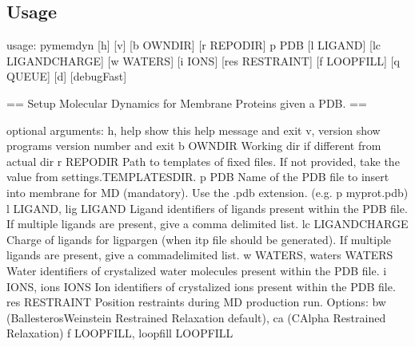 \documentclass[letterpaper,10pt,english]{sphinxmanual}
\begin{document}
\subsection{Usage}
\label{\detokenize{pymemdyn:usage}}
\begin{sphinxVerbatim}[commandchars=\\\{\}]
usage: pymemdyn [\PYGZhy{}h] [\PYGZhy{}v] [\PYGZhy{}b OWN\PYGZus{}DIR] [\PYGZhy{}r REPO\PYGZus{}DIR] \PYGZhy{}p PDB [\PYGZhy{}l LIGAND]
             [\PYGZhy{}\PYGZhy{}lc LIGAND\PYGZus{}CHARGE] [\PYGZhy{}w WATERS] [\PYGZhy{}i IONS] [\PYGZhy{}\PYGZhy{}res RESTRAINT]
             [\PYGZhy{}f LOOP\PYGZus{}FILL] [\PYGZhy{}q QUEUE] [\PYGZhy{}d] [\PYGZhy{}\PYGZhy{}debugFast]

== Setup Molecular Dynamics for Membrane Proteins given a PDB. ==

optional arguments:
  \PYGZhy{}h, \PYGZhy{}\PYGZhy{}help            show this help message and exit
  \PYGZhy{}v, \PYGZhy{}\PYGZhy{}version         show program\PYGZsq{}s version number and exit
  \PYGZhy{}b OWN\PYGZus{}DIR            Working dir if different from actual dir
  \PYGZhy{}r REPO\PYGZus{}DIR           Path to templates of fixed files. If not provided,
                        take the value from settings.TEMPLATES\PYGZus{}DIR.
  \PYGZhy{}p PDB                Name of the PDB file to insert into membrane for MD
                        (mandatory). Use the .pdb extension. (e.g. \PYGZhy{}p
                        myprot.pdb)
  \PYGZhy{}l LIGAND, \PYGZhy{}\PYGZhy{}lig LIGAND
                        Ligand identifiers of ligands present within the PDB
                        file. If multiple ligands are present, give a comma\PYGZhy{}
                        delimited list.
  \PYGZhy{}\PYGZhy{}lc LIGAND\PYGZus{}CHARGE    Charge of ligands for ligpargen (when itp file should
                        be generated). If multiple ligands are present, give a
                        comma\PYGZhy{}delimited list.
  \PYGZhy{}w WATERS, \PYGZhy{}\PYGZhy{}waters WATERS
                        Water identifiers of crystalized water molecules
                        present within the PDB file.
  \PYGZhy{}i IONS, \PYGZhy{}\PYGZhy{}ions IONS  Ion identifiers of crystalized ions present within the
                        PDB file.
  \PYGZhy{}\PYGZhy{}res RESTRAINT       Position restraints during MD production run. Options:
                        bw (Ballesteros\PYGZhy{}Weinstein Restrained Relaxation \PYGZhy{}
                        default), ca (C\PYGZhy{}Alpha Restrained Relaxation)
  \PYGZhy{}f LOOP\PYGZus{}FILL, \PYGZhy{}\PYGZhy{}loop\PYGZus{}fill LOOP\PYGZus{}FILL

\end{sphinxVerbatim}
\end{document}
